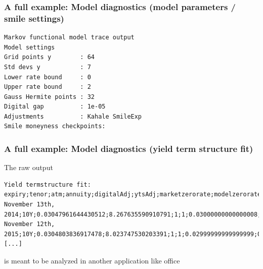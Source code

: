\documentclass{beamer}
\begin{document}
\begin{frame}[fragile]
\frametitle{A full example: Model diagnostics (model parameters / smile settings)}
\begin{verbatim}
Markov functional model trace output 
Model settings
Grid points y        : 64
Std devs y           : 7
Lower rate bound     : 0
Upper rate bound     : 2
Gauss Hermite points : 32
Digital gap          : 1e-05
Adjustments          : Kahale SmileExp 
Smile moneyness checkpoints: 
\end{verbatim}
\end{frame}

\begin{frame}[fragile]
\frametitle{A full example: Model diagnostics (yield term structure fit)}
The raw output
\begin{verbatim}
Yield termstructure fit:
expiry;tenor;atm;annuity;digitalAdj;ytsAdj;marketzerorate;modelzerorate;diff(bp)
November 13th, 2014;10Y;0.03047961644430512;8.267635590910791;1;1;0.03000000000000008;0.03008016185429107;-0.8016185429099432
November 12th, 2015;10Y;0.0304803836917478;8.023747530203391;1;1;0.02999999999999999;0.03003959599137232;-0.395959913723383
[...]
\end{verbatim}
is meant to be analyzed in another application like office
\end{frame}
\end{document}

